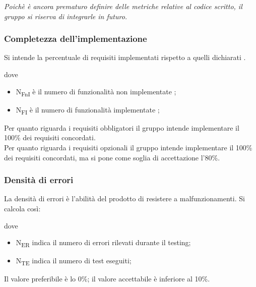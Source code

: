 \documentclass[../piano_di_qualifica.tex]{subfiles}
\begin{document}
\emph{Poichè è ancora prematuro definire delle metriche relative al codice scritto, il gruppo si riserva di integrarle in futuro.}

\subsubsection{Completezza dell'implementazione}
Si intende la percentuale di requisiti implementati rispetto a quelli dichiarati .

dove
\begin{itemize}
\item N\textsubscript{FnI} è il numero di funzionalità non implementate ;
\item N\textsubscript{FI} è il numero di funzionalità implementate ;
\end{itemize}

Per quanto riguarda i requisiti obbligatori il gruppo intende implementare il 100\% dei requisiti concordati. \\
Per quanto riguarda i requisiti opzionali il gruppo intende implementare il 100\% dei requisiti concordati, ma si pone come soglia di accettazione l’80\%. 

\subsubsection{Densità di errori}
La densità di errori è l'abilità del prodotto di resistere a malfunzionamenti. Si calcola così:\par


dove
\begin{itemize}
\item N\textsubscript{ER} indica il numero di errori rilevati durante il testing;
\item N\textsubscript{TE} indica il numero di test eseguiti;
\end{itemize}

Il valore preferibile è lo 0\%; il valore accettabile è inferiore al 10\%.

\end{document}
